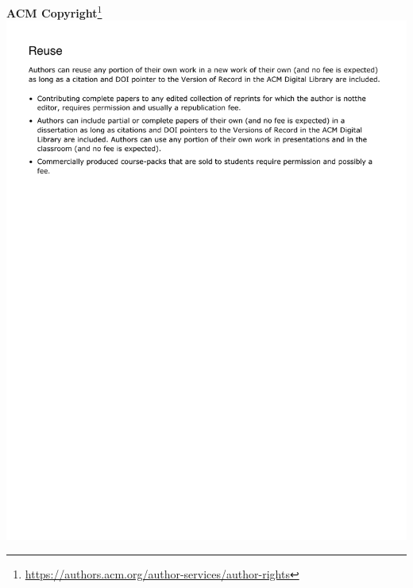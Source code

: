 \documentclass{uicthesi}
\begin{document}
\newpage
\textbf{ACM Copyright}\footnote{\url{https://authors.acm.org/author-services/author-rights}}\\
\includegraphics[width=5.5in]{copyright/acm.pdf}




\end{document}

